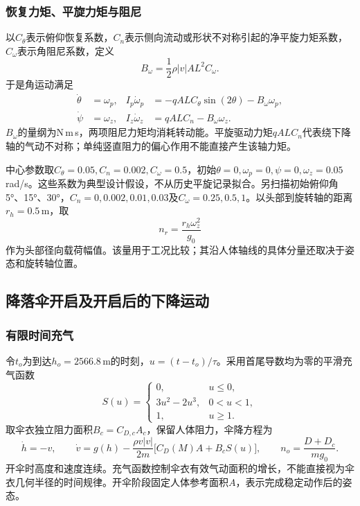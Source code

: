 \documentclass[11pt,a4paper]{article}
\begin{document}
\subsubsection{恢复力矩、平旋力矩与阻尼}
以$C_\theta$表示俯仰恢复系数，$C_n$表示侧向流动或形状不对称引起的净平旋力矩系数，$C_\omega$表示角阻尼系数，定义
\begin{equation}
 B_\omega=\frac12\rho|v|AL^2C_\omega.
\end{equation}
于是角运动满足
\begin{align}
 \dot\theta&=\omega_p,&
 I_p\dot\omega_p&=-qALC_\theta\sin(2\theta)-B_\omega\omega_p,
 \label{eq:pitch}\\
 \dot\psi&=\omega_z,&
 I_z\dot\omega_z&=qALC_n-B_\omega\omega_z.
 \label{eq:spin}
\end{align}
$B_\omega$的量纲为N\,m\,s，两项阻尼力矩均消耗转动能。平旋驱动力矩$qALC_n$代表绕下降轴的气动不对称；单纯竖直阻力的偏心作用不能直接产生该轴力矩。

中心参数取$C_\theta=0.05,C_n=0.002,C_\omega=0.5$，初始$\theta=0,\omega_p=0,\psi=0,\omega_z=0.05$\,rad/s。这些系数为典型设计假设，不从历史平旋记录拟合。另扫描初始俯仰角5°、15°、30°，$C_n=0,0.002,0.01,0.03$及$C_\omega=0.25,0.5,1$。以头部到旋转轴的距离$r_h=0.5$\,m，取
\begin{equation}
 n_r=\frac{r_h\omega_z^2}{g_0}
 \label{eq:spinload}
\end{equation}
作为头部径向载荷幅值。该量用于工况比较；其沿人体轴线的具体分量还取决于姿态和旋转轴位置。

\subsection{降落伞开启及开启后的下降运动}
\subsubsection{有限时间充气}
令$t_o$为到达$h_o=2566.8$\,m的时刻，$u=(t-t_o)/\tau$。采用首尾导数均为零的平滑充气函数
\begin{equation}
 S(u)=\begin{cases}0,&u\le0,\\3u^2-2u^3,&0<u<1,\\1,&u\ge1.\end{cases}
 \label{eq:inflation}
\end{equation}
取伞衣独立阻力面积$B_c=C_{D,c}A_c$，保留人体阻力，伞降方程为
\begin{equation}
 \dot h=-v,\qquad
 \dot v=g(h)-\frac{\rho v|v|}{2m}\big[C_D(M)A+B_cS(u)\big],
 \qquad n_o=\frac{D+D_c}{mg_0}.
 \label{eq:canopy}
\end{equation}
开伞时高度和速度连续。充气函数控制伞衣有效气动面积的增长，不能直接视为伞衣几何半径的时间规律。开伞阶段固定人体参考面积$A$，表示完成稳定动作后的姿态。
\end{document}
